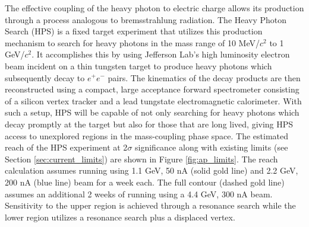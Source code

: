 The effective coupling of the heavy photon to electric charge allows its 
production through a process analogous to bremsstrahlung radiation.  The Heavy
Photon Search (HPS)  is a fixed target experiment that utilizes this production
mechanism to search
for heavy photons in the mass range of 10 MeV/$c^2$ to 1 GeV/$c^2$. It accomplishes
this by using 
Jefferson Lab's high luminosity electron beam incident on a thin
tungsten target to produce heavy photons which subsequently decay to $e^+e^-$
pairs. The kinematics of the decay products are then reconstructed using 
a compact, large acceptance forward spectrometer consisting of a silicon vertex
tracker and a lead tungstate electromagnetic calorimeter. With such a setup,
HPS will be capable of not only searching for heavy photons which decay promptly
at the target but also for those that are long lived, giving 
HPS access to unexplored regions in the mass-coupling phase space. 
The estimated reach of the HPS experiment at 
2$\sigma$ significance along with existing limits 
(see Section \ref{sec:current_limits}) are shown in Figure 
\ref{fig:ap_limits}. The reach calculation assumes running using 1.1
GeV, 50 nA (solid gold line) and 2.2 GeV, 200 nA (blue line) beam for a week
each.  The full 
contour (dashed gold line) assumes an additional 2 weeks of running using 
a 4.4 GeV, 300 nA beam. 
Sensitivity to the upper region is achieved through a resonance search while
the lower region utilizes a resonance search plus a displaced vertex.
